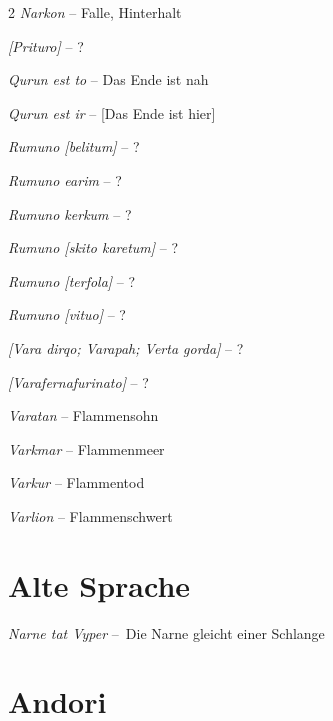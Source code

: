 \documentclass[10pt, a4paper, oneside]{book}
\newcommand{\reflegende}[1]{\hyperref[Legende: #1]{#1}}
\newcommand{\refprodukt}[1]{\hyperref[Produkt: #1]{#1}}
\newcommand{\refstorytext}[1]{\hyperref[Storytext: #1]{#1}}
\begin{document}
\begin{multicols}{2}
\textit{Narkon} – Falle, Hinterhalt

\textit{[Prituro]} – ?

\textit{Qurun est to} – Das Ende ist nah

\textit{Qurun est ir} – [Das Ende ist hier]

\textit{Rumuno [belitum]} – ?

\textit{Rumuno earim} – ?

\textit{Rumuno kerkum} – ?

\textit{Rumuno [skito karetum]} – ?

\textit{Rumuno [terfola]} – ?

\textit{Rumuno [vituo]} – ?

\textit{[Vara dirqo; Varapah; Verta gorda]} – ?

\textit{[Varafernafurinato]} – ?

\textit{Varatan} – Flammensohn

\textit{Varkmar} – Flammenmeer

\textit{Varkur} – Flammentod

\textit{Varlion} – Flammenschwert







\section{Alte Sprache}


\textit{Narne tat Vyper} – Die Narne gleicht einer Schlange










\section{Andori}


\end{multicols}
\end{document}
